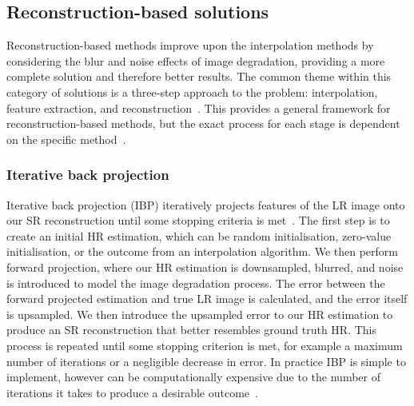 \subsection{Reconstruction-based solutions}
Reconstruction-based methods improve upon the interpolation methods by considering the blur and noise effects of image degradation, providing a more complete solution and therefore better results. The common theme within this category of solutions is a three-step approach to the problem: interpolation, feature extraction, and reconstruction~\cite{superResRemoteSensingOverview}. This provides a general framework for reconstruction-based methods, but the exact process for each stage is dependent on the specific method~\cite{superResRemoteSensingOverview}.

\subsubsection{Iterative back projection}
Iterative back projection (IBP) iteratively projects features of the LR image onto our SR reconstruction until some stopping criteria is met~\cite{ref}. The first step is to create an initial HR estimation, which can be random initialisation, zero-value initialisation, or the outcome from an interpolation algorithm. We then perform forward projection, where our HR estimation is downsampled, blurred, and noise is introduced to model the image degradation process. The error between the forward projected estimation and true LR image is calculated, and the error itself is upsampled. We then introduce the upsampled error to our HR estimation to produce an SR reconstruction that better resembles ground truth HR. This process is repeated until some stopping criterion is met, for example a maximum number of iterations or a negligible decrease in error. In practice IBP is simple to implement, however can be computationally expensive due to the number of iterations it takes to produce a desirable outcome~\cite{ref}.

